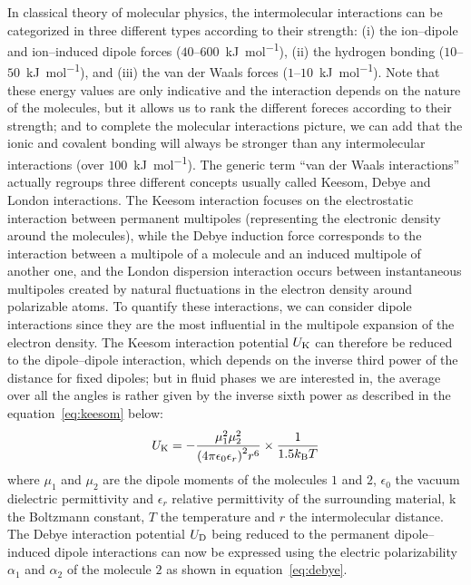 \documentclass[main.tex]{subfiles}
\begin{document}
In classical theory of molecular physics, the intermolecular interactions can be categorized in three different types according to their strength: (i) the ion--dipole and ion--induced dipole forces ($40$--$600$~\si{\kilo\joule\per\mol}), (ii) the hydrogen bonding ($10$--$50$~\si{\kilo\joule\per\mol}), and (iii) the van der Waals forces ($1$--$10$~\si{\kilo\joule\per\mol}). Note that these energy values are only indicative and the interaction depends on the nature of the molecules, but it allows us to rank the different foreces according to their strength; and to complete the molecular interactions picture, we can add that the ionic and covalent bonding will always be stronger than any intermolecular interactions (over $100$~\si{\kilo\joule\per\mol}). The generic term ``van der Waals interactions'' actually regroups three different concepts usually called Keesom, Debye and London interactions. The Keesom interaction focuses on the electrostatic interaction between permanent multipoles (representing the electronic density around the molecules),\autocite{keesom1915second} while the Debye induction force corresponds to the interaction between a multipole of a molecule and an induced multipole of another one,\autocite{Roberts_1938} and the London dispersion interaction occurs between instantaneous multipoles created by natural fluctuations in the electron density around polarizable atoms.\autocite{london1930theorie,polanyi1932section} To quantify these interactions, we can consider dipole interactions since they are the most influential in the multipole expansion of the electron density. The Keesom interaction potential $U_{\text{K}}$ can therefore be reduced to the dipole--dipole interaction, which depends on the inverse third power of the distance for fixed dipoles; but in fluid phases we are interested in, the average over all the angles is rather given by the inverse sixth power as described in the equation~\ref{eq:keesom} below:
\begin{equation}\label{eq:keesom}
  U_{\text{K}} = -\dfrac{\mu_1^2\mu_2^2}{{(4\pi\epsilon_0\epsilon_r)}^2r^6}\times\dfrac{1}{ 1.5k_{\text{B}}T}
\end{equation}
where $\mu_1$ and $\mu_2$ are the dipole moments of the molecules $1$ and $2$, $\epsilon_0$ the vacuum dielectric permittivity and $\epsilon_r$ relative permittivity of the surrounding material, k the Boltzmann constant, $T$ the temperature and $r$ the intermolecular distance. The Debye interaction potential $U_{\text{D}}$ being reduced to the permanent dipole--induced dipole interactions can now be expressed using the electric polarizability $\alpha_1$ and $\alpha_2$ of the molecule $2$ as shown in equation~\ref{eq:debye}.
\end{document}
